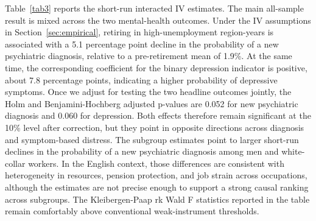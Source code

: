 \documentclass[arguments, manuscript, 11pt]{aastex631}
\begin{document}
Table~\ref{tab3} reports the short-run interacted IV estimates. The main all-sample result is mixed across the two mental-health outcomes. Under the IV assumptions in Section~\ref{sec:empirical}, retiring in high-unemployment region-years is associated with a 5.1 percentage point decline in the probability of a new psychiatric diagnosis, relative to a pre-retirement mean of 1.9\%. At the same time, the corresponding coefficient for the binary depression indicator is positive, about 7.8 percentage points, indicating a higher probability of depressive symptoms. Once we adjust for testing the two headline outcomes jointly, the Holm and Benjamini-Hochberg adjusted p-values are 0.052 for new psychiatric diagnosis and 0.060 for depression. Both effects therefore remain significant at the 10\% level after correction, but they point in opposite directions across diagnosis and symptom-based distress. The subgroup estimates point to larger short-run declines in the probability of a new psychiatric diagnosis among men and white-collar workers. In the English context, those differences are consistent with heterogeneity in resources, pension protection, and job strain across occupations, although the estimates are not precise enough to support a strong causal ranking across subgroups. The Kleibergen-Paap rk Wald F statistics reported in the table remain comfortably above conventional weak-instrument thresholds.
\end{document}
